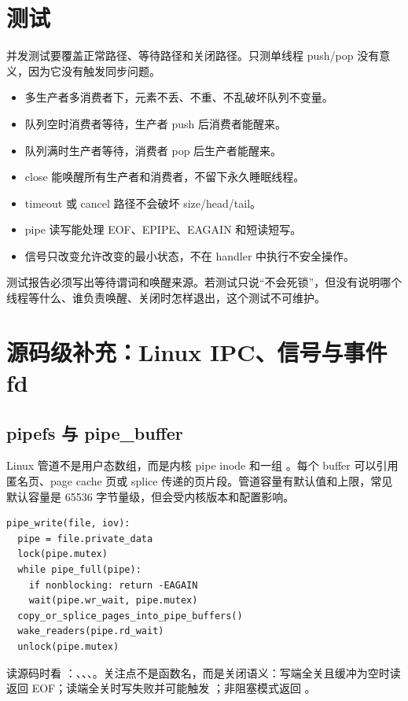 \section{测试}

并发测试要覆盖正常路径、等待路径和关闭路径。只测单线程 push/pop 没有意义，因为它没有触发同步问题。

\begin{itemize}
\tightlist
\item 多生产者多消费者下，元素不丢、不重、不乱破坏队列不变量。
\item 队列空时消费者等待，生产者 push 后消费者能醒来。
\item 队列满时生产者等待，消费者 pop 后生产者能醒来。
\item close 能唤醒所有生产者和消费者，不留下永久睡眠线程。
\item timeout 或 cancel 路径不会破坏 size/head/tail。
\item pipe 读写能处理 EOF、EPIPE、EAGAIN 和短读短写。
\item 信号只改变允许改变的最小状态，不在 handler 中执行不安全操作。
\end{itemize}

测试报告必须写出等待谓词和唤醒来源。若测试只说“不会死锁”，但没有说明哪个线程等什么、谁负责唤醒、关闭时怎样退出，这个测试不可维护。

\section{源码级补充：Linux IPC、信号与事件 fd}

\subsection{pipefs 与 pipe\_buffer}

Linux 管道不是用户态数组，而是内核 pipe inode 和一组 。每个 buffer 可以引用匿名页、page cache 页或 splice 传递的页片段。管道容量有默认值和上限，常见默认容量是 65536 字节量级，但会受内核版本和配置影响。

\begin{lstlisting}
pipe_write(file, iov):
  pipe = file.private_data
  lock(pipe.mutex)
  while pipe_full(pipe):
    if nonblocking: return -EAGAIN
    wait(pipe.wr_wait, pipe.mutex)
  copy_or_splice_pages_into_pipe_buffers()
  wake_readers(pipe.rd_wait)
  unlock(pipe.mutex)
\end{lstlisting}

读源码时看 ：、、、。关注点不是函数名，而是关闭语义：写端全关且缓冲为空时读返回 EOF；读端全关时写失败并可能触发 ；非阻塞模式返回 。

